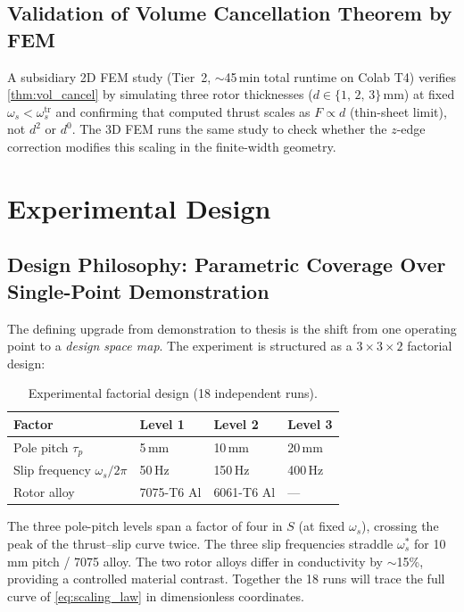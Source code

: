 \documentclass[12pt,letterpaper]{article}
\begin{document}
\subsection{Validation of Volume Cancellation Theorem by FEM}

A subsidiary 2D FEM study (Tier~2, $\sim$45\,min total runtime on Colab T4)
verifies \cref{thm:vol_cancel} by simulating three rotor thicknesses
($d \in \{1,\,2,\,3\}$\,mm) at fixed $\omega_s < \omega_s^{\mathrm{tr}}$ and
confirming that computed thrust scales as $F \propto d$ (thin-sheet limit), not
$d^2$ or $d^0$. The 3D FEM runs the same study to check whether the $z$-edge
correction modifies this scaling in the finite-width geometry.

\section{Experimental Design}

\subsection{Design Philosophy: Parametric Coverage Over Single-Point Demonstration}

The defining upgrade from demonstration to thesis is the shift from one operating
point to a \emph{design space map}. The experiment is structured as a
$3 \times 3 \times 2$ factorial design:

\begin{table}[H]
\centering
\caption{Experimental factorial design (18 independent runs).}
\label{tab:factorial}
\begin{tabular}{llll}
\toprule
\textbf{Factor} & \textbf{Level 1} & \textbf{Level 2} & \textbf{Level 3} \\
\midrule
Pole pitch $\tau_p$ & 5\,mm & 10\,mm & 20\,mm \\
Slip frequency $\omega_s/2\pi$ & 50\,Hz & 150\,Hz & 400\,Hz \\
Rotor alloy & 7075-T6 Al & 6061-T6 Al & — \\
\bottomrule
\end{tabular}
\end{table}

The three pole-pitch levels span a factor of four in $S$ (at fixed $\omega_s$),
crossing the peak of the thrust--slip curve twice. The three slip frequencies straddle
$\omega_s^*$ for 10\,mm pitch / 7075 alloy. The two rotor alloys differ in conductivity
by $\sim$15\%, providing a controlled material contrast. Together the 18 runs will
trace the full curve of \cref{eq:scaling_law} in dimensionless coordinates.
\end{document}
